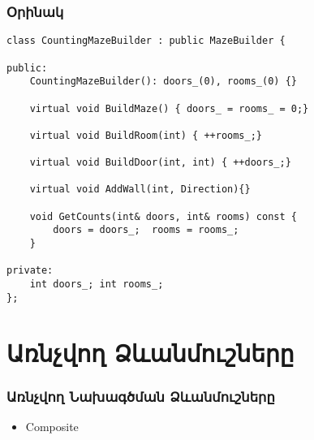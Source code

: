 \documentclass{beamer}
\begin{document}
\begin{frame}[fragile]\frametitle{Օրինակ}
\begin{english}
\begin{verbatim}
class CountingMazeBuilder : public MazeBuilder {

public:
    CountingMazeBuilder(): doors_(0), rooms_(0) {}

    virtual void BuildMaze() { doors_ = rooms_ = 0;}

    virtual void BuildRoom(int) { ++rooms_;}

    virtual void BuildDoor(int, int) { ++doors_;}

    virtual void AddWall(int, Direction){}

    void GetCounts(int& doors, int& rooms) const {
        doors = doors_;  rooms = rooms_;
    }

private:
    int doors_; int rooms_;
};
\end{verbatim}
\end{english}
\end{frame}

\section{Առնչվող Ձևանմուշները}
\begin{frame}\frametitle{Առնչվող Նախագծման Ձևանմուշները}
\begin{itemize}
    \item Composite
\end{itemize}
\end{frame}
\end{document}
